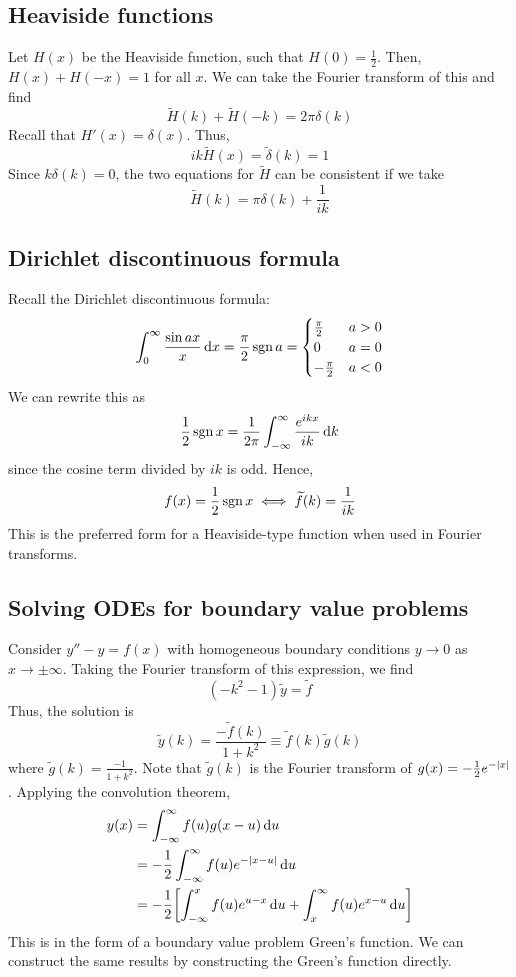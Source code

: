 \subsection{Heaviside functions}
Let \( H(x) \) be the Heaviside function, such that \( H(0) = \frac{1}{2} \).
Then, \( H(x) + H(-x) = 1 \) for all \( x \).
We can take the Fourier transform of this and find
\[
	\widetilde H(k) + \widetilde H(-k) = 2\pi \delta(k)
\]
Recall that \( H'(x) = \delta(x) \).
Thus,
\[
	ik \widetilde H(x) = \widetilde \delta(k) = 1
\]
Since \( k \delta(k) = 0 \), the two equations for \( \widetilde H \) can be consistent if we take
\[
	\widetilde H(k) = \pi\delta(k) + \frac{1}{ik}
\]

\subsection{Dirichlet discontinuous formula}
Recall the Dirichlet discontinuous formula:
\[
	\int_0^\infty \frac{\sin ax}{x} \dd{x} = \frac{\pi}{2} \operatorname{sgn} a = \begin{cases}
		\frac{\pi}{2}  & a > 0 \\
		0              & a = 0 \\
		-\frac{\pi}{2} & a < 0
	\end{cases}
\]
We can rewrite this as
\[
	\frac{1}{2} \operatorname{sgn} x = \frac{1}{2\pi} \int_{-\infty}^\infty \frac{e^{ikx}}{ik} \dd{k}
\]
since the cosine term divided by \( ik \) is odd.
Hence,
\[
	f(x) = \frac{1}{2} \operatorname{sgn} x \iff \widetilde f(k) = \frac{1}{ik}
\]
This is the preferred form for a Heaviside-type function when used in Fourier transforms.

\subsection{Solving ODEs for boundary value problems}
Consider \( y'' - y = f(x) \) with homogeneous boundary conditions \( y \to 0 \) as \( x \to \pm \infty \).
Taking the Fourier transform of this expression, we find
\[
	(-k^2 - 1) \widetilde y = \widetilde f
\]
Thus, the solution is
\[
	\widetilde y(k) = \frac{-\widetilde f(k)}{1+k^2} \equiv \widetilde f(k) \widetilde g(k)
\]
where \( \widetilde g(k) = \frac{-1}{1 + k^2} \).
Note that \( \widetilde g(k) \) is the Fourier transform of \( g(x) = -\frac{1}{2} e^{-\abs{x}} \).
Applying the convolution theorem,
\begin{align*}
	y(x) & = \int_{-\infty}^\infty f(u) g(x-u) \dd{u}                                                    \\
	     & = -\frac{1}{2} \int_{-\infty}^\infty f(u) e^{-\abs{x-u}}\dd{u}                                \\
	     & = -\frac{1}{2} \qty[ \int_{-\infty}^x f(u) e^{u-x}\dd{u} + \int_x^\infty f(u) e^{x-u}\dd{u} ]
\end{align*}
This is in the form of a boundary value problem Green's function.
We can construct the same results by constructing the Green's function directly.

